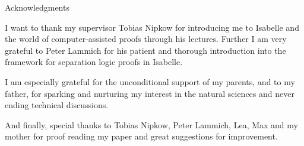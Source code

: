 \thispagestyle{empty}

\vspace*{20mm}

\begin{center}
{ Acknowledgments}
\end{center}

\vspace{10mm}
I want to thank my supervisor Tobias Nipkow for introducing me to
Isabelle and the world of computer-assisted proofs through his lectures.
Further I am very grateful to Peter Lammich for his patient
and thorough introduction into the framework for separation logic proofs in Isabelle.

I am especially grateful for the unconditional support of my parents,
and to my father,
for sparking and nurturing my interest in the natural sciences
and never ending technical discussions.

And finally, special thanks to Tobias Nipkow, Peter Lammich, Lea, Max and my mother for proof
reading my paper and great suggestions for improvement.

\cleardoublepage{}
